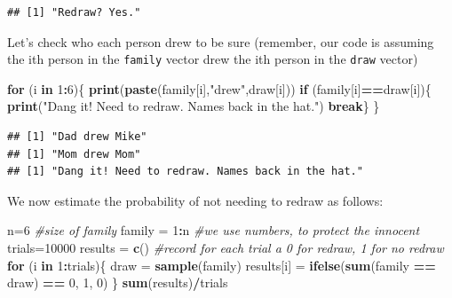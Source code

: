 \documentclass[
]{book}
\newenvironment{Shaded}{\begin{snugshade}}{\end{snugshade}}
\newcommand{\CommentTok}[1]{\textcolor[rgb]{0.56,0.35,0.01}{\textit{#1}}}
\newcommand{\ControlFlowTok}[1]{\textcolor[rgb]{0.13,0.29,0.53}{\textbf{#1}}}
\newcommand{\DecValTok}[1]{\textcolor[rgb]{0.00,0.00,0.81}{#1}}
\newcommand{\FunctionTok}[1]{\textcolor[rgb]{0.13,0.29,0.53}{\textbf{#1}}}
\newcommand{\NormalTok}[1]{#1}
\newcommand{\OtherTok}[1]{\textcolor[rgb]{0.56,0.35,0.01}{#1}}
\newcommand{\SpecialCharTok}[1]{\textcolor[rgb]{0.81,0.36,0.00}{\textbf{#1}}}
\newcommand{\StringTok}[1]{\textcolor[rgb]{0.31,0.60,0.02}{#1}}
\theoremstyle{definition}
\theoremstyle{definition}
\theoremstyle{definition}
\theoremstyle{definition}
\theoremstyle{remark}
\begin{document}
\begin{verbatim}
## [1] "Redraw? Yes."
\end{verbatim}

Let's check who each person drew to be sure (remember, our code is assuming the ith person in the \texttt{family} vector drew the ith person in the \texttt{draw} vector)

\begin{Shaded}
\begin{Highlighting}[]
\ControlFlowTok{for}\NormalTok{ (i }\ControlFlowTok{in} \DecValTok{1}\SpecialCharTok{:}\DecValTok{6}\NormalTok{)\{}
  \FunctionTok{print}\NormalTok{(}\FunctionTok{paste}\NormalTok{(family[i],}\StringTok{"drew"}\NormalTok{,draw[i]))}
  \ControlFlowTok{if}\NormalTok{ (family[i]}\SpecialCharTok{==}\NormalTok{draw[i])\{}
    \FunctionTok{print}\NormalTok{(}\StringTok{"Dang it! Need to redraw. Names back in the hat."}\NormalTok{) }
    \ControlFlowTok{break}\NormalTok{\}}
\NormalTok{\}}
\end{Highlighting}
\end{Shaded}

\begin{verbatim}
## [1] "Dad drew Mike"
## [1] "Mom drew Mom"
## [1] "Dang it! Need to redraw. Names back in the hat."
\end{verbatim}

We now estimate the probability of not needing to redraw as follows:

\begin{Shaded}
\begin{Highlighting}[]
\NormalTok{n}\OtherTok{=}\DecValTok{6} \CommentTok{\#size of family}
\NormalTok{family }\OtherTok{=} \DecValTok{1}\SpecialCharTok{:}\NormalTok{n }\CommentTok{\#we use numbers, to protect the innocent}
\NormalTok{trials}\OtherTok{=}\DecValTok{10000}
\NormalTok{results }\OtherTok{=} \FunctionTok{c}\NormalTok{() }\CommentTok{\#record for each trial a 0 for redraw, 1 for no redraw }
\ControlFlowTok{for}\NormalTok{ (i }\ControlFlowTok{in} \DecValTok{1}\SpecialCharTok{:}\NormalTok{trials)\{}
\NormalTok{  draw }\OtherTok{=} \FunctionTok{sample}\NormalTok{(family)}
\NormalTok{  results[i] }\OtherTok{=} \FunctionTok{ifelse}\NormalTok{(}\FunctionTok{sum}\NormalTok{(family }\SpecialCharTok{==}\NormalTok{ draw) }\SpecialCharTok{==} \DecValTok{0}\NormalTok{, }\DecValTok{1}\NormalTok{, }\DecValTok{0}\NormalTok{)}
\NormalTok{\}}
\FunctionTok{sum}\NormalTok{(results)}\SpecialCharTok{/}\NormalTok{trials}
\end{Highlighting}
\end{Shaded}
\end{document}
